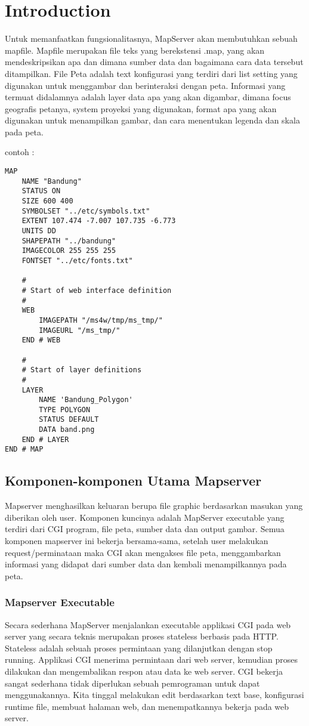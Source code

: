 ﻿\section{Introduction}

Untuk memanfaatkan fungsionalitasnya, MapServer akan membutuhkan sebuah mapfile. Mapfile merupakan file teks yang berekstensi .map,
yang akan mendeskripsikan apa dan dimana sumber data dan bagaimana cara data tersebut ditampilkan. 
File Peta adalah text konfigurasi yang terdiri dari list setting yang digunakan untuk menggambar dan berinteraksi dengan peta. 
Informasi yang termuat didalamnya adalah layer data apa yang akan digambar, dimana focus geografis petanya, 
system proyeksi yang digunakan, format apa yang akan digunakan untuk menampilkan gambar, dan cara menentukan legenda dan skala pada peta.

contoh :
\begin{verbatim}
MAP
    NAME "Bandung"
    STATUS ON
    SIZE 600 400
    SYMBOLSET "../etc/symbols.txt"
    EXTENT 107.474 -7.007 107.735 -6.773
    UNITS DD
    SHAPEPATH "../bandung"
    IMAGECOLOR 255 255 255
    FONTSET "../etc/fonts.txt"

    #
    # Start of web interface definition
    #
    WEB
        IMAGEPATH "/ms4w/tmp/ms_tmp/"
        IMAGEURL "/ms_tmp/"
    END # WEB

    #
    # Start of layer definitions
    #
    LAYER
        NAME 'Bandung_Polygon'
        TYPE POLYGON
        STATUS DEFAULT
        DATA band.png
    END # LAYER
END # MAP
\end{verbatim}

\subsection{Komponen-komponen Utama Mapserver}
Mapserver menghasilkan keluaran berupa file graphic berdasarkan masukan yang diberikan oleh user. Komponen kuncinya adalah MapServer executable yang terdiri dari CGI program, file peta, sumber data dan output gambar. Semua komponen mapserver ini bekerja bersama-sama, setelah user melakukan request/perminataan maka CGI akan mengakses file peta, menggambarkan informasi yang didapat dari sumber data dan kembali menampilkannya pada peta.
	\subsubsection {Mapserver Executable}
		Secara sederhana MapServer menjalankan executable applikasi CGI pada web server yang secara teknis merupakan proses
 		stateless berbasis pada HTTP. Stateless adalah sebuah proses permintaan yang dilanjutkan dengan stop running. Applikasi CGI 		
		menerima permintaan dari web server, kemudian proses dilakukan dan mengembalikan respon atau data ke web server. CGI bekerja 		
		sangat sederhana tidak diperlukan sebuah pemrograman untuk dapat menggunakannya. Kita tinggal melakukan edit berdasarkan text base,
		konfigurasi runtime file, membuat halaman web, dan menempatkannya bekerja pada web server.

